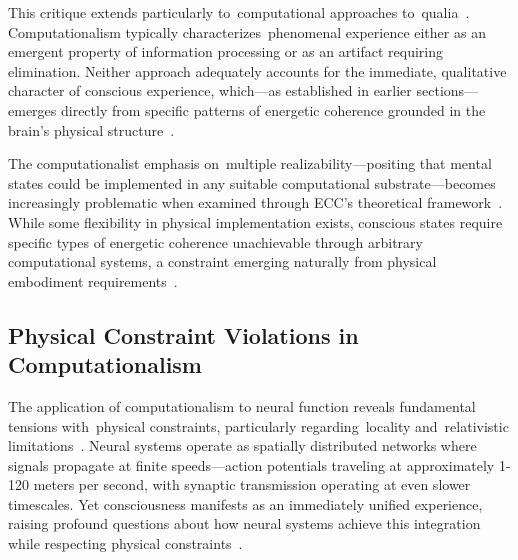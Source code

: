 This critique extends particularly to~computational approaches to~qualia~\cite{chalmers1997conscious,seth2021being}. Computationalism typically characterizes~phenomenal experience either as an emergent property of information processing or as an artifact requiring elimination. Neither approach adequately accounts for the immediate, qualitative character of conscious experience, which—as established in earlier sections—emerges directly from specific patterns of energetic coherence grounded in the brain's physical structure~\cite{varela1996neurophenomenology,gallagher2020phenomenological}.

The computationalist emphasis on~multiple realizability—positing that mental states could be implemented in any suitable computational substrate—becomes increasingly problematic when examined through ECC's theoretical framework~\cite{polger2016multiple,gillett2016reduction}. While some flexibility in physical implementation exists, conscious states require specific types of energetic coherence unachievable through arbitrary computational systems, a constraint emerging naturally from physical embodiment requirements~\cite{mossio2015biological,difrisco2014hylomorphism}.

\subsection*{Physical Constraint Violations in Computationalism}

The application of computationalism to neural function reveals fundamental tensions with~physical constraints, particularly regarding~locality and~relativistic limitations~\cite{breakspear2005dynamics,Gidon2020}. Neural systems operate as spatially distributed networks where signals propagate at finite speeds—action potentials traveling at approximately 1-120 meters per second, with synaptic transmission operating at even slower timescales. Yet consciousness manifests as an immediately unified experience, raising profound questions about how neural systems achieve this integration while respecting physical constraints~\cite{hunt2024electromagnetic,McFadden2020}.

